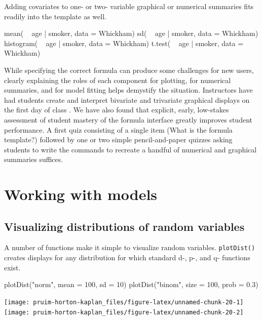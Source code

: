 \noindent
Adding covariates to one- or two- variable graphical or numerical
summaries fits readily into the template as well.

\begin{Schunk}
\begin{Sinput}
     mean( ~ age | smoker, data = Whickham)
       sd( ~ age | smoker, data = Whickham)
histogram( ~ age | smoker, data = Whickham)
   t.test( ~ age | smoker, data = Whickham)
\end{Sinput}
\end{Schunk}

While specifying the correct formula can produce some challenges for new
users, clearly explaining the roles of each component for plotting, for
numerical summaries, and for model fitting helps demystify the
situation. Instructors have had students create and interpret bivariate
and trivariate graphical displays on the first day of class
\citep{Wang:USCOTS:2015}. We have also found that explicit, early,
low-stakes assessment of student mastery of the formula interface
greatly improves student performance. A first quiz consisting of a
single item (What is the formula template?) followed by one or two
simple pencil-and-paper quizzes asking students to write the commands to
recreate a handful of numerical and graphical summaries suffices.

\section{Working with models}\label{working-with-models}

\subsection{Visualizing distributions of random
variables}\label{visualizing-distributions-of-random-variables}

A number of functions make it simple to visualize random variables.
\texttt{plotDist()} creates displays for any distribution for which
standard d-, p-, and q- functions exist.

\begin{Schunk}
\begin{Sinput}
plotDist("norm", mean = 100, sd = 10)
plotDist("binom", size = 100, prob = 0.3)
\end{Sinput}


\begin{center}\texttt{[image: pruim-horton-kaplan\_files/figure-latex/unnamed-chunk-20-1]} \texttt{[image: pruim-horton-kaplan\_files/figure-latex/unnamed-chunk-20-2]} \end{center}

\end{Schunk}

